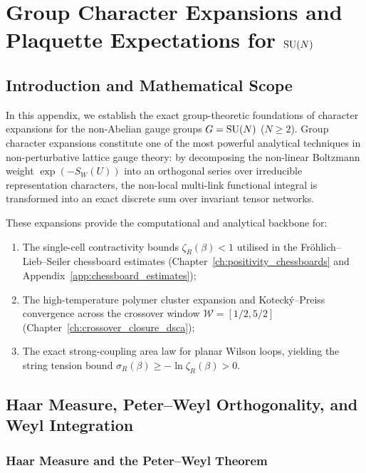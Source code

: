 \chapter{Group Character Expansions and Plaquette Expectations for \texorpdfstring{$\mathrm{SU}(N)$}{SU(N)}}
\label{app:characters}

\section{Introduction and Mathematical Scope}
\label{sec:app_a_intro}

In this appendix, we establish the exact group-theoretic foundations of character expansions for the non-Abelian gauge groups $G = \mathrm{SU}(N)$ ($N \ge 2$). Group character expansions constitute one of the most powerful analytical techniques in non-perturbative lattice gauge theory: by decomposing the non-linear Boltzmann weight $\exp(-S_W(U))$ into an orthogonal series over irreducible representation characters, the non-local multi-link functional integral is transformed into an exact discrete sum over invariant tensor networks.

These expansions provide the computational and analytical backbone for:
\begin{enumerate}
    \item The single-cell contractivity bounds $\zeta_R(\beta) < 1$ utilised in the Fr\"ohlich--Lieb--Seiler chessboard estimates (Chapter~\ref{ch:positivity_chessboards} and Appendix~\ref{app:chessboard_estimates});
    \item The high-temperature polymer cluster expansion and Koteck\'y--Preiss convergence across the crossover window $\mathcal{W} = [1/2, 5/2]$ (Chapter~\ref{ch:crossover_closure_dsca});
    \item The exact strong-coupling area law for planar Wilson loops, yielding the string tension bound $\sigma_R(\beta) \ge -\ln \zeta_R(\beta) > 0$.
\end{enumerate}

\section{Haar Measure, Peter--Weyl Orthogonality, and Weyl Integration}
\label{sec:haar_peter_weyl}

\subsection{Haar Measure and the Peter--Weyl Theorem}
\label{subsec:peter_weyl_ortho_app}

